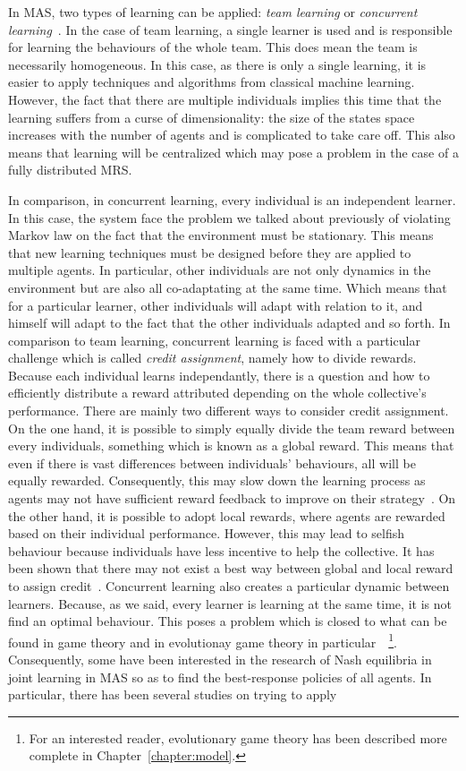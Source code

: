     In MAS, two types of learning can be applied: \emph{team learning} or \emph{concurrent learning}~\cite{Panait2005}. In the case of team learning, a single learner is used and is responsible for learning the behaviours of the whole team. This does mean the team is necessarily homogeneous. In this case, as there is only a single learning, it is easier to apply techniques and algorithms from classical machine learning. However, the fact that there are multiple individuals implies this time that the learning suffers from a curse of dimensionality: the size of the states space increases with the number of agents and is complicated to take care off. This also means that learning will be centralized which may pose a problem in the case of a fully distributed MRS. 

    In comparison, in concurrent learning, every individual is an independent learner. In this case, the system face the problem we talked about previously of violating Markov law on the fact that the environment must be stationary. This means that new learning techniques must be designed before they are applied to multiple agents. In particular, other individuals are not only dynamics in the environment but are also all co-adaptating at the same time. Which means that for a particular learner, other individuals will adapt with relation to it, and himself will adapt to the fact that the other individuals adapted and so forth. In comparison to team learning, concurrent learning is faced with a particular challenge which is called \emph{credit assignment}, namely how to divide rewards. Because each individual learns independantly, there is a question and how to efficiently distribute a reward attributed depending on the whole collective's performance. There are mainly two different ways to consider credit assignment. On the one hand, it is possible to simply equally divide the team reward between every individuals, something which is known as a global reward. This means that even if there is vast differences between individuals' behaviours, all will be equally rewarded. Consequently, this may slow down the learning process as agents may not have sufficient reward feedback to improve on their strategy~\cite{Wolpert2001}. On the other hand, it is possible to adopt local rewards, where agents are rewarded based on their individual performance. However, this may lead to selfish behaviour because individuals have less incentive to help the collective. It has been shown that there may not exist a best way between global and local reward to assign credit~\cite{Balch1999}. Concurrent learning also creates a particular dynamic between learners. Because, as we said, every learner is learning at the same time, it is not find an optimal behaviour. This poses a problem which is closed to what can be found in game theory and in evolutionay game theory in particular~\cite{MaynardSmith1973, Fudenberg1998, Bloembergen2015}~\footnote{For an interested reader, evolutionary game theory has been described more complete in Chapter~\ref{chapter:model}.}. Consequently, some have been interested in the research of Nash equilibria in joint learning in MAS so as to find the best-response policies of all agents. In particular, there has been several studies on trying to apply 